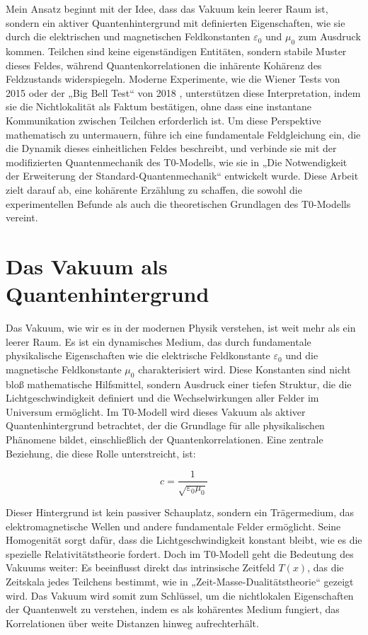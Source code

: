 \documentclass[a4paper,12pt]{article}
\newcommand{\Tfield}{T(x)}
\theoremstyle{definition}
\theoremstyle{remark}
\begin{document}
	Mein Ansatz beginnt mit der Idee, dass das Vakuum kein leerer Raum ist, sondern ein aktiver Quantenhintergrund mit definierten Eigenschaften, wie sie durch die elektrischen und magnetischen Feldkonstanten \(\varepsilon_0\) und \(\mu_0\) zum Ausdruck kommen. Teilchen sind keine eigenständigen Entitäten, sondern stabile Muster dieses Feldes, während Quantenkorrelationen die inhärente Kohärenz des Feldzustands widerspiegeln. Moderne Experimente, wie die Wiener Tests von 2015 \cite{Giustina2015} oder der „Big Bell Test“ von 2018 \cite{BigBellTest2018}, unterstützen diese Interpretation, indem sie die Nichtlokalität als Faktum bestätigen, ohne dass eine instantane Kommunikation zwischen Teilchen erforderlich ist. Um diese Perspektive mathematisch zu untermauern, führe ich eine fundamentale Feldgleichung ein, die die Dynamik dieses einheitlichen Feldes beschreibt, und verbinde sie mit der modifizierten Quantenmechanik des T0-Modells, wie sie in „Die Notwendigkeit der Erweiterung der Standard-Quantenmechanik“ \cite{pascher_quantum_2025} entwickelt wurde. Diese Arbeit zielt darauf ab, eine kohärente Erzählung zu schaffen, die sowohl die experimentellen Befunde als auch die theoretischen Grundlagen des T0-Modells vereint.
	
	\section{Das Vakuum als Quantenhintergrund}
	
	Das Vakuum, wie wir es in der modernen Physik verstehen, ist weit mehr als ein leerer Raum. Es ist ein dynamisches Medium, das durch fundamentale physikalische Eigenschaften wie die elektrische Feldkonstante \(\varepsilon_0\) und die magnetische Feldkonstante \(\mu_0\) charakterisiert wird. Diese Konstanten sind nicht bloß mathematische Hilfsmittel, sondern Ausdruck einer tiefen Struktur, die die Lichtgeschwindigkeit definiert und die Wechselwirkungen aller Felder im Universum ermöglicht. Im T0-Modell wird dieses Vakuum als aktiver Quantenhintergrund betrachtet, der die Grundlage für alle physikalischen Phänomene bildet, einschließlich der Quantenkorrelationen. Eine zentrale Beziehung, die diese Rolle unterstreicht, ist:
	
	\begin{equation}
		c = \frac{1}{\sqrt{\varepsilon_0 \mu_0}}
	\end{equation}
	
	Dieser Hintergrund ist kein passiver Schauplatz, sondern ein Trägermedium, das elektromagnetische Wellen und andere fundamentale Felder ermöglicht. Seine Homogenität sorgt dafür, dass die Lichtgeschwindigkeit konstant bleibt, wie es die spezielle Relativitätstheorie fordert. Doch im T0-Modell geht die Bedeutung des Vakuums weiter: Es beeinflusst direkt das intrinsische Zeitfeld \(\Tfield\), das die Zeitskala jedes Teilchens bestimmt, wie in „Zeit-Masse-Dualitätstheorie“ \cite{pascher_params_2025} gezeigt wird. Das Vakuum wird somit zum Schlüssel, um die nichtlokalen Eigenschaften der Quantenwelt zu verstehen, indem es als kohärentes Medium fungiert, das Korrelationen über weite Distanzen hinweg aufrechterhält.
	
\end{document}

